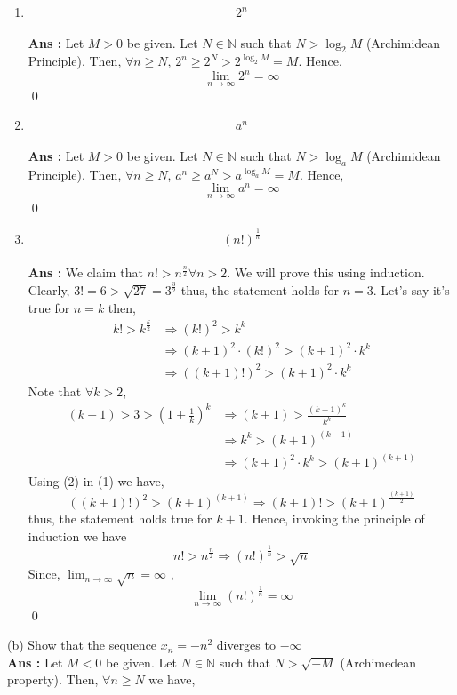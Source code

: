 \documentclass[10pt]{article}
\newcommand{\nn}{\mathbb{N}}
\newcommand{\inflim}{\lim_{n\to\infty}}
\newcommand{\sol}{\textbf{Ans : }}
\begin{document}
        \begin{enumerate}[label={(\roman*)}]
          \item $$2^n$$\\
        \sol Let $M > 0$ be given. Let $N \in \mathbb{N}$ such that $N > \log_2M$ (Archimidean Principle). Then, $\forall   n\geq N$, $2^n \geq 2^N > 2^{\log_2M} = M$. Hence, $$\inflim 2^n = \infty$$\qed\\
        \item $$a^n$$\\
        \sol Let $M > 0$ be given. Let $N \in \mathbb{N}$ such that $N > \log_aM$ (Archimidean Principle). Then, $\forall   n\geq N$, $a^n \geq a^N > a^{\log_aM} = M$. Hence, $$\inflim a^n = \infty$$\qed\\
        \item $$(n!)^\frac{1}{n}$$\\
        \sol We claim that $n! > n^\frac{n}{2} \forall n > 2$. We will prove this using induction. Clearly, $3! = 6 > \sqrt{27} = 3^\frac{3}{2}$ thus, the statement holds for $n = 3$. Let's say it's true for $n = k$ then,
        \begin{align*}
            k! > k^\frac{k}{2} &\Rightarrow (k!)^2 > k^k \\
            &\Rightarrow (k+1)^2\cdot(k!)^2 > (k+1)^2\cdot k^k\\
            &\Rightarrow ((k+1)!)^2 > (k+1)^2\cdot k^k \tag{1}
        \end{align*}
        Note that $\forall k > 2$, 
        \begin{align*}
            (k + 1) > 3 >\left(1+\frac{1}{k}\right)^k &\Rightarrow (k + 1) > \frac{(k+1)^k}{k^k}\\
            &\Rightarrow k^k > (k + 1)^{(k-1)}\\
            &\Rightarrow (k + 1)^2 \cdot k^k > (k + 1)^{(k+1)} \tag {2}
        \end{align*}
        Using (2) in (1) we have,
        $$((k+1)!)^2 > (k+1)^{(k+1)} \Rightarrow (k+1)! > (k+1)^\frac{(k+1)}{2}$$
        thus, the statement holds true for $k+1$. Hence, invoking the principle of induction we have $$n! > n^\frac{n}{2} \Rightarrow (n!)^\frac{1}{n} > \sqrt{n}$$ 
        Since, $\inflim \sqrt{n} = \infty$ , $$\inflim (n!)^\frac{1}{n} = \infty$$\qed\\
        \end{enumerate}
        (b) Show that the sequence $x_n = -n^2$ diverges to $-\infty$\\
        \sol Let $M < 0$ be given. Let $N \in \nn$ such that $N > \sqrt{-M}$ (Archimedean property). Then, $\forall n \geq N$ we have,
\end{document}
